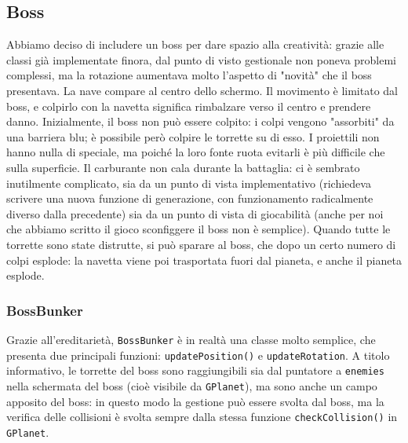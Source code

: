 \documentclass{article}
\begin{document}
\subsection{Boss}
Abbiamo deciso di includere un boss per dare spazio alla creatività: grazie alle classi già implementate finora, dal punto di visto gestionale non poneva problemi complessi, ma la rotazione aumentava molto l'aspetto di "novità" che il boss presentava. La nave compare al centro dello schermo. Il movimento è limitato dal boss, e colpirlo con la navetta significa rimbalzare verso il centro e prendere danno. Inizialmente, il boss non può essere colpito: i colpi vengono "assorbiti" da una barriera blu; è possibile però colpire le torrette su di esso. I proiettili non hanno nulla di speciale, ma poiché la loro fonte ruota evitarli è più difficile che sulla superficie. Il carburante non cala durante la battaglia: ci è sembrato inutilmente complicato, sia da un punto di vista implementativo (richiedeva scrivere una nuova funzione di generazione, con funzionamento radicalmente diverso dalla precedente) sia da un punto di vista di giocabilità (anche per noi che abbiamo scritto il gioco sconfiggere il boss non è semplice). Quando tutte le torrette sono state distrutte, si può sparare al boss, che dopo un certo numero di colpi esplode: la navetta viene poi trasportata fuori dal pianeta, e anche il pianeta esplode.
\subsubsection{BossBunker}
Grazie all'ereditarietà, \lstinline{BossBunker} è in realtà una classe molto semplice, che presenta due principali funzioni: \lstinline{updatePosition()} e \lstinline{updateRotation}. A titolo informativo, le torrette del boss sono raggiungibili sia dal puntatore a \lstinline{enemies} nella schermata del boss (cioè visibile da \lstinline{GPlanet}), ma sono anche un campo apposito del boss: in questo modo la gestione può essere svolta dal boss, ma la verifica delle collisioni è svolta sempre dalla stessa funzione \lstinline{checkCollision()} in \lstinline{GPlanet}.
\end{document}
